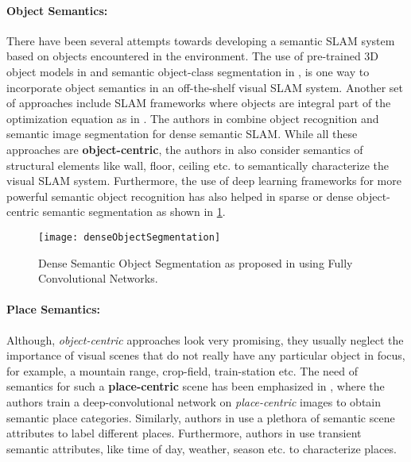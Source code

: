 \documentclass{article}
\begin{document}
\paragraph{Object Semantics:}
There have been several attempts towards developing a semantic SLAM system based on objects encountered in the environment. The use of pre-trained 3D object models in \cite{civera2011towards} and semantic object-class segmentation in \cite{stuckler2012semantic}, is one way to incorporate object semantics in an off-the-shelf visual SLAM system. Another set of approaches include SLAM frameworks where objects are integral part of the optimization equation as in \cite{fioraio2013joint,salas2013slam++,vasudevan2007cognitive,galvez2016real}. The authors in \cite{salas2014dense} combine object recognition and semantic image segmentation for dense semantic SLAM. While all these approaches are \textbf{object-centric}, the authors in \cite{flint2010growing,nuchter2008towards} also consider semantics of structural elements like wall, floor, ceiling etc. to semantically characterize the visual SLAM system. Furthermore, the use of deep learning frameworks for more powerful semantic object recognition has also helped in sparse \cite{girshick2014rich} or dense \cite{long2015fully,chen2014semantic} object-centric semantic segmentation as shown in \ref{fig:denseObjectSegmentation}.

\begin{figure}
 \centering
 \texttt{[image: denseObjectSegmentation]}
 \caption{Dense Semantic Object Segmentation as proposed in \cite{long2015fully} using Fully Convolutional Networks.}
 \label{fig:denseObjectSegmentation}
\end{figure}


\paragraph{Place Semantics:}
Although, \emph{object-centric} approaches look very promising, they usually neglect the importance of visual scenes that do not really have any particular object in focus, for example, a mountain range, crop-field, train-station etc. The need of semantics for such a \textbf{place-centric} scene has been emphasized in \cite{zhou2014learning}, where the authors train a deep-convolutional network on \emph{place-centric} images to obtain semantic place categories. Similarly, authors in \cite{Patterson2012SunAttributes} use a plethora of semantic scene attributes to label different places. Furthermore, authors in \cite{laffont2014transient} use transient semantic attributes, like time of day, weather, season etc. to characterize places.
\end{document}
